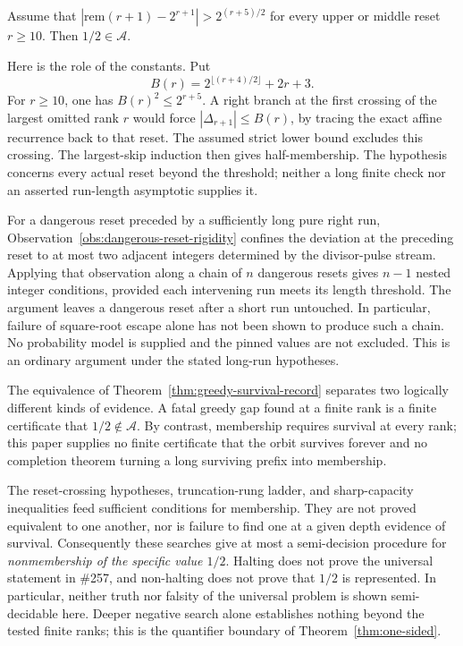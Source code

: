 \begin{thm}\label{thm:lower-bound-every-reset}
Assume that
$|\mathrm{rem}(r+1)-2^{r+1}|>2^{(r+5)/2}$ for every upper or
middle reset $r\ge10$.  Then $1/2\in\mathcal A$.

Here is the role of the constants.  Put
\[
 B(r)=2^{\lfloor(r+4)/2\rfloor}+2r+3.
\]
For $r\ge10$, one has $B(r)^2\le2^{r+5}$.
A right branch at the first crossing of the largest omitted rank $r$
would force $|\Delta_{r+1}|\le B(r)$, by tracing the exact affine
recurrence back to that reset.  The assumed strict lower bound
excludes this crossing.  The largest-skip induction then gives
half-membership.  The hypothesis concerns every actual reset beyond
the threshold; neither a long finite check nor an asserted
run-length asymptotic supplies it.
\end{thm}

\begin{rem}
\label{rem:dangerous-reset-chain-scope}
For a dangerous reset preceded by a sufficiently long pure right run,
Observation~\ref{obs:dangerous-reset-rigidity} confines the deviation at
the preceding reset to at most two adjacent integers determined by the
divisor-pulse stream. Applying that observation along a chain of $n$
dangerous resets gives $n-1$ nested integer conditions, provided each
intervening run meets its length threshold. The argument leaves a
dangerous reset after a short run untouched. In particular, failure of
square-root escape alone has not been shown to produce such a chain.
No probability model is supplied and the pinned values are not excluded.
This is an ordinary argument under the stated long-run hypotheses.
\end{rem}

\begin{thm}\label{thm:one-sided-finite-decision-boundary}
The equivalence of Theorem~\ref{thm:greedy-survival-record} separates two logically different kinds of evidence. A fatal greedy gap found at a finite rank is
a finite certificate that $1/2\notin\mathcal A$. By contrast, membership requires survival at
every rank; this paper supplies no finite certificate that the orbit survives forever and no
completion theorem turning a long surviving prefix into membership.

The reset-crossing hypotheses, truncation-rung ladder, and sharp-capacity inequalities feed
sufficient conditions for membership. They are not proved equivalent to one another,
nor is failure to find one at a given depth evidence of survival. Consequently these searches
give at most a semi-decision procedure for \emph{nonmembership of the specific value $1/2$}.
Halting does not prove the universal statement in \#257, and non-halting does not prove that
$1/2$ is represented. In particular, neither truth nor falsity of the universal problem is
shown semi-decidable here. Deeper negative search alone establishes nothing beyond the tested
finite ranks; this is the quantifier boundary of Theorem~\ref{thm:one-sided}.
\end{thm}

